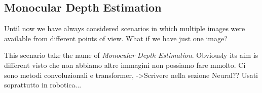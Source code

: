 \subsection{Monocular Depth Estimation}
Until now we have always considered scenarios in which multiple images were 
available from different points of view. What if we have just one image?

This scenario take the name of \textit{Monocular Depth Estimation}. Obviously its
aim is different visto che non abbiamo altre immagini non possiamo fare mmolto.
Ci sono metodi convoluzionali e transformer, ->Scrivere nella sezione Neural??
Usati soprattutto in robotica...
